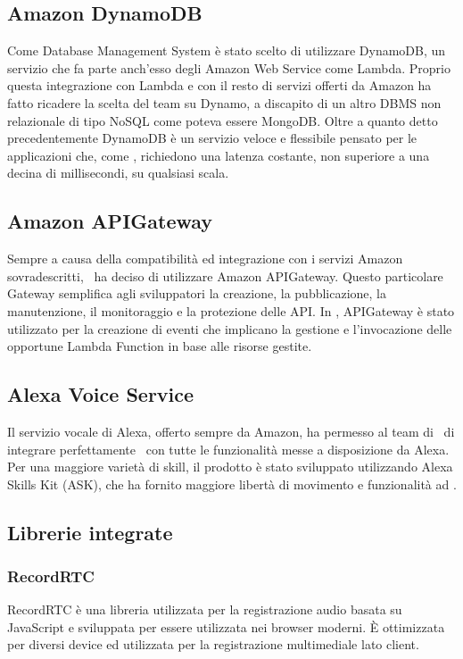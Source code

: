 \documentclass[../ManualeSviluppatore_v2.0.0.tex]{subfiles}
\begin{document}
	\subsection{Amazon DynamoDB}
		Come \gls{Database Management System} è stato scelto di utilizzare DynamoDB, un servizio che fa parte anch'esso degli Amazon Web Service come Lambda. Proprio questa integrazione con Lambda e con il resto di servizi offerti da Amazon ha fatto ricadere la scelta del team su Dynamo, a discapito di un altro DBMS non relazionale di tipo NoSQL come poteva essere MongoDB. Oltre a quanto detto precedentemente DynamoDB è un servizio veloce e flessibile pensato per le applicazioni che, come \atavi, richiedono una latenza costante, non superiore a una decina di millisecondi, su qualsiasi scala.
	\subsection{Amazon APIGateway}
		Sempre a causa della compatibilità ed integrazione con i servizi Amazon sovradescritti, \kpanic\ ha deciso di utilizzare Amazon APIGateway. Questo particolare Gateway semplifica agli sviluppatori la creazione, la pubblicazione, la manutenzione, il monitoraggio e la protezione delle API. In \atavi, APIGateway è stato utilizzato per la creazione di eventi che implicano la gestione e l'invocazione delle opportune Lambda Function in base alle risorse gestite.
	\subsection{Alexa Voice Service}
		Il servizio vocale di Alexa, offerto sempre da Amazon, ha permesso al team di \kpanic\ di integrare perfettamente \atavi\ con tutte le funzionalità messe a disposizione da Alexa. Per una maggiore varietà di skill, il prodotto è stato sviluppato utilizzando Alexa Skills Kit (\gls{ASK}), che ha fornito maggiore libertà di movimento e funzionalità ad \atavi.
	\subsection{Librerie integrate}
		\subsubsection{RecordRTC}
			RecordRTC è una libreria utilizzata per la registrazione audio basata su JavaScript e sviluppata per essere utilizzata nei browser moderni. È ottimizzata per diversi device ed utilizzata per la registrazione multimediale lato client.
\end{document}

